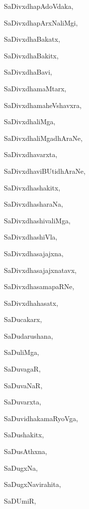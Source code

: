 \begin{multicols}{2}
{SaDivxdhapAdoVdaka}, \pageref{SaDivxdhapAdoVdaka}

{SaDivxdhapArxNaliMgi}, \pageref{SaDivxdhapArxNaliMgi}

{SaDivxdhaBakatx}, \pageref{SaDivxdhaBakatx}

{SaDivxdhaBakitx}, \pageref{SaDivxdhaBakitx}

{SaDivxdhaBavi}, \pageref{SaDivxdhaBavi}

{SaDivxdhamaMtarx}, \pageref{SaDivxdhamaMtarx}

{SaDivxdhamaheVshavxra}, \pageref{SaDivxdhamaheVshavxra}

{SaDivxdhaliMga}, \pageref{SaDivxdhaliMga}

{SaDivxdhaliMgadhAraNe}, \pageref{SaDivxdhaliMgadhAraNe}

{SaDivxdhavarxta}, \pageref{SaDivxdhavarxta}

{SaDivxdhaviBUtidhAraNe}, \pageref{SaDivxdhaviBUtidhAraNe}

{SaDivxdhashakitx}, \pageref{SaDivxdhashakitx}

{SaDivxdhasharaNa}, \pageref{SaDivxdhasharaNa}

{SaDivxdhashivaliMga}, \pageref{SaDivxdhashivaliMga}

{SaDivxdhashiVla}, \pageref{SaDivxdhashiVla}

{SaDivxdhasajajxna}, \pageref{SaDivxdhasajajxna}

{SaDivxdhasajajxnatavx}, \pageref{SaDivxdhasajajxnatavx}

{SaDivxdhasamapaRNe}, \pageref{SaDivxdhasamapaRNe}

{SaDivxdhahasatx}, \pageref{SaDivxdhahasatx}

{SaDucakarx}, \pageref{SaDucakarx}

{SaDudarushana}, \pageref{SaDudarushana}

{SaDuliMga}, \pageref{SaDuliMga}

{SaDuvagaR}, \pageref{SaDuvagaR}

{SaDuvaNaR}, \pageref{SaDuvaNaR}

{SaDuvarxta}, \pageref{SaDuvarxta}

{SaDuvidhakamaRyoVga}, \pageref{SaDuvidhakamaRyoVga}

{SaDushakitx}, \pageref{SaDushakitx}

{SaDusAthxna}, \pageref{SaDusAthxna}

{SaDugxNa}, \pageref{SaDugxNa}

{SaDugxNavirahita}, \pageref{SaDugxNavirahita}

{SaDUmiR}, \pageref{SaDUmiR}


\end{multicols}
